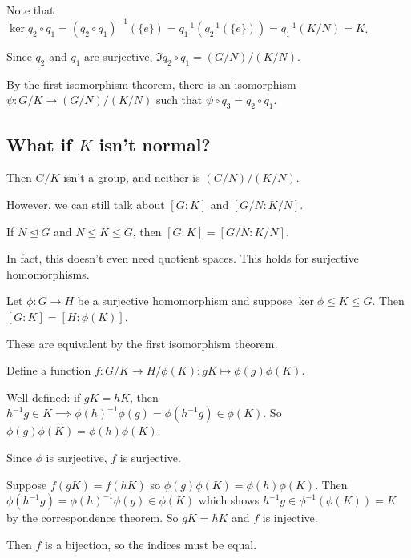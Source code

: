 \documentclass[12pt,letterpaper]{report}
\begin{document}
\begin{center}
\end{center}

\begin{thmproof}
  Note that $\ker q_2 \circ q_1 = (q_2 \circ q_1)^{-1}(\{e\}) = q_1^{-1}(q_2^{-1}(\{e\}))
    = q_1^{-1}(K/N) = K$.

  Since $q_2$ and $q_1$ are surjective, $\Im q_2 \circ q_1 = (G/N)/(K/N)$.

  By the first isomorphism theorem, there is an isomorphism $\psi \colon G/K \to (G/N)/(K/N)$ such
  that $\psi \circ q_3 = q_2 \circ q_1$.
\end{thmproof}

\pagebreak
\subsection[What if K isn't normal?]{What if $K$ isn't normal?}

Then $G/K$ isn't a group, and neither is $(G/N)/(K/N)$.

However, we can still talk about $[G : K]$ and $[G/N : K/N]$.

\begin{prop}{}{}
  If $N \trianglelefteq G$ and $N \leq K \leq G$, then $[G : K] = [G/N : K/N]$.
\end{prop}

In fact, this doesn't even need quotient spaces.
This holds for surjective homomorphisms.

\begin{prop}{}{}
  Let $\phi \colon G \to H$ be a surjective homomorphism and suppose $\ker\phi \leq K \leq G$.
  Then $[G : K] = [H : \phi(K)]$.
\end{prop}

These are equivalent by the first isomorphism theorem.

\begin{thmproof}
  Define a function $f \colon G/K \to H/\phi(K) : gK \mapsto \phi(g)\phi(K)$.

  Well-defined: if $gK = hK$, then
  $h^{-1}g \in K \implies \phi(h)^{-1}\phi(g) = \phi(h^{-1}g) \in \phi(K)$.
  So $\phi(g)\phi(K) = \phi(h)\phi(K)$.

  Since $\phi$ is surjective, $f$ is surjective.

  Suppose $f(gK) = f(hK)$ so $\phi(g)\phi(K) = \phi(h)\phi(K)$.
  Then $\phi(h^{-1}g) = \phi(h)^{-1}\phi(g) \in \phi(K)$ which shows
  $h^{-1}g \in \phi^{-1}(\phi(K)) = K$ by the correspondence theorem.
  So $gK = hK$ and $f$ is injective.

  Then $f$ is a bijection, so the indices must be equal.
\end{thmproof}
\end{document}
